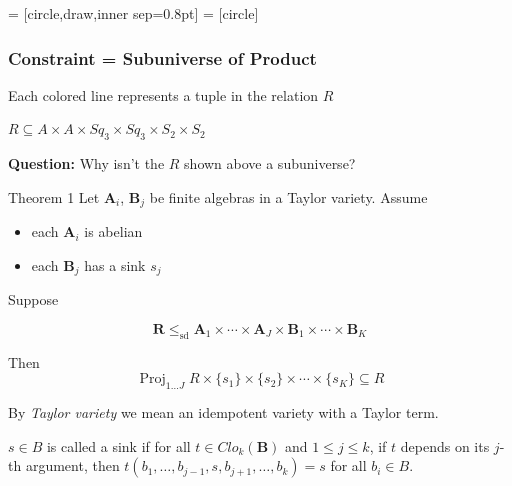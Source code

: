 \documentclass[10pt,xcolor=dvipsnames%
   ]{beamer}
\newcommand{\Proj}{\ensuremath{\operatorname{Proj}}}
\renewcommand{\.}{\cdot}
\newcommand{\bA}{\ensuremath{\mathbf{A}}}
\newcommand{\bR}{\ensuremath{\mathbf{R}}}
\begin{document}
\begin{frame}
  \newcommand{\bS}{\ensuremath{\mathbf{S}}}
  \newcommand{\bSq}{\ensuremath{\mathbf{Sq}}}

 = [circle,draw,inner sep=0.8pt]
 = [circle]
  \frametitle{Constraint = Subuniverse of Product}
  \begin{center}
  \end{center}

  Each colored line represents a tuple in the relation $R$
  
  $R \subseteq A \times A \times Sq_3 \times Sq_3 \times S_2 \times S_2$

  \pause
      {\bf Question:} Why isn't the $R$ shown above a subuniverse?

\end{frame}

\newcommand{\bB}{\ensuremath{\mathbf{B}}}

\begin{frame}

  \newcommand{\kk}{\ensuremath{\underline{k}}}
\newcommand{\sdp}{\ensuremath{\leq_{\mathrm{sd}}}}


\begin{exampleblock}{Theorem 1}
Let $\bA_i$, $\bB_j$ be finite algebras in a Taylor variety. Assume

\begin{itemize}
\item 
each $\bA_i$ is \alert{abelian}

\item
each $\bB_j$ has a \alert{sink} $s_j$
\end{itemize}

Suppose

  \[
  \bR \sdp \bA_1 \times \cdots \times \bA_J \times \bB_1 \times \cdots \times \bB_K
  \]

  Then
  \[
  \Proj_{1 \dots J}R \times \{s_1\} \times \{s_2\} \times \cdots \times \{s_K\}  \subseteq R
  \]
\end{exampleblock}

By \emph{Taylor variety} we mean an \alert{idempotent} variety with a Taylor term.

\pause

$s\in B$ is called a \alert{sink} if for all
$t \in Clo_k(\bB)$ and $1\leq j \leq k$, if 
$t$ depends on its $j$-th argument, then
$t(b_1, \dots, b_{j-1}, s, b_{j+1}, \dots, b_{k})=s$
for all $b_i \in B$.
\end{frame}
\end{document}
